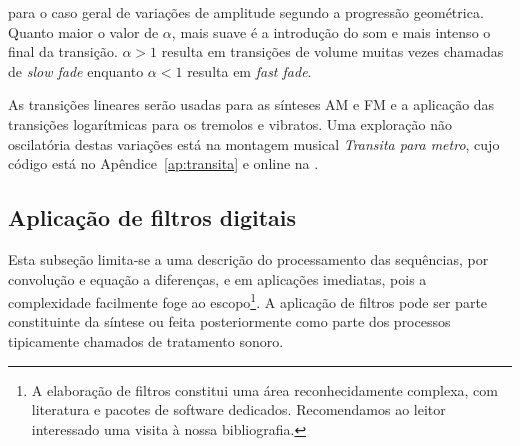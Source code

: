 para o caso geral de variações de amplitude segundo a progressão geométrica. Quanto maior o valor de $\alpha$, mais suave é a introdução do som e mais intenso o final da transição. $\alpha>1$ resulta em transições de volume muitas vezes chamadas de \emph{slow fade} enquanto $\alpha<1$ resulta em \emph{fast fade}.\cite{guillaume}

As transições lineares serão usadas para
as sínteses AM e FM e a aplicação das transições
logarítmicas para os tremolos e vibratos.
Uma exploração não oscilatória destas variações
está na montagem musical \emph{Transita para metro},
cujo código está no Apêndice~\ref{ap:transita} e online
na \massa.\cite{MASSA}

\subsection{Aplicação de filtros digitais}\label{subsec:filtros}
Esta subseção limita-se a uma descrição
do processamento das sequências, por convolução
e equação a diferenças, e em aplicações
imediatas, pois a complexidade facilmente
foge ao escopo\footnote{A elaboração de filtros
constitui uma área reconhecidamente complexa, com literatura
e pacotes de software dedicados. 
Recomendamos ao leitor
interessado uma visita à nossa bibliografia.\cite{Openheim,smith}}. A aplicação de filtros pode
ser parte constituinte da síntese ou feita posteriormente
como parte dos processos tipicamente chamados de tratamento sonoro.

